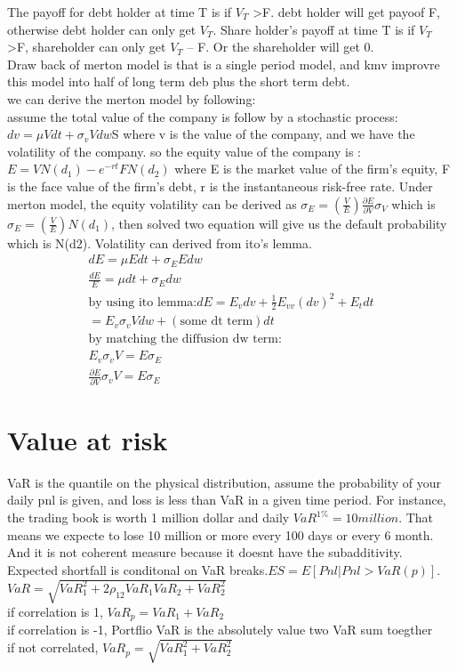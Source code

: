 \documentclass[a4paper,11pt]{article}
\begin{document}
The payoff for debt holder at time T is if $V_T$ \textgreater F. debt holder will get payoof F, otherwise
debt holder can only get $V_T$.
Share holder's payoff at time T is if $V_T$ \textgreater F, shareholder can only get $V_T$ --  F. Or the
shareholder will get 0.\\
Draw back of merton model is that is a single period model, and kmv improvre this model into half of long term deb plus the short term debt.\\
we can derive the merton model by following:\\
assume the total value of the company is follow by a stochastic process: $dv=\mu Vdt+ \sigma_v Vdw$S where v is the value of the company, and we have the volatility of the company. so the  equity value of the company is :\\
$E=VN(d_1)-e^{-rt}FN(d_2)$ where E is the market value of the ﬁrm’s equity, F is the face value of the ﬁrm’s debt, r is the instantaneous risk-free rate. Under merton model, the equity volatility can be derived as $\sigma_E=(\frac{V}{E}) \frac{\partial E}{\partial V}\sigma_V$ which is $ \sigma_E=(\frac{V}{E}) N(d_1)$, then solved two equation will give us the default probability which is N(d2). Volatility can derived from ito's lemma.\\
\begin{equation}
\begin{aligned}
dE=\mu Edt+\sigma_E Edw\\
\frac{dE}{E}=\mu dt+ \sigma_E dw\\
\mbox{by using ito lemma:}  dE=E_vdv+\frac{1}{2}E_{vv}(dv)^2+E_tdt\\
=E_v\sigma_v V dw+(\mbox{some dt term})dt\\
\mbox{by matching the diffusion dw term:}\\
E_v\sigma_v V=E \sigma_E\\
\frac{\partial E}{\partial V} \sigma_v V=E \sigma_E
\end{aligned}
\end{equation}
\section{Value at risk}
VaR is the quantile on the physical distribution, assume the probability of your daily pnl is given, and loss is less than VaR in a given time period. For instance, the trading book is worth 1 million dollar and daily $VaR^{1\%}=10million$. That means we expecte to lose 10 million or more every 100 days or every 6 month. And it is not coherent measure because it doesnt have the subadditivity. Expected shortfall is conditonal on VaR breaks.$ES=E[Pnl|Pnl>VaR(p)]$.\\
$VaR=\sqrt{VaR_1^2+2\rho_{12}VaR_1 VaR_2+VaR_2^2}$\\
if correlation is 1, $VaR_p=VaR_1+VaR_2$\\
if correlation is -1, Portflio VaR is the absolutely value two VaR sum toegther\\
if  not correlated, $VaR_p=\sqrt{VaR_1^2+VaR_2^2}$\\
\end{document}
